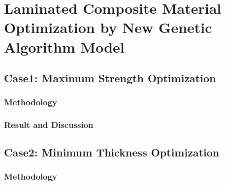 
\chapter{Laminated Composite Material Optimization by New Genetic Algorithm Model} %

\label{Chapter4} %


\section{Case1: Maximum Strength Optimization}

\subsection{Methodology}
\subsection{Result and Discussion}

\section{Case2: Minimum Thickness Optimization}

\subsection{Methodology}


